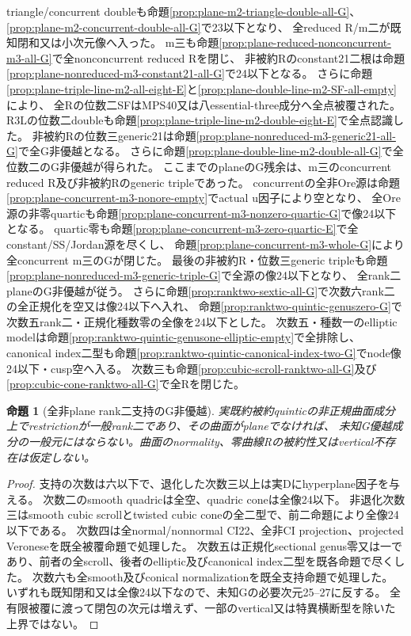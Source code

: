 \documentclass[a4paper,11pt]{ltjsarticle}
\newtheorem{proposition}{命題}[section]
\theoremstyle{definition}
\begin{document}
triangle/concurrent doubleも命題\ref{prop:plane-m2-triangle-double-all-G}、\ref{prop:plane-m2-concurrent-double-all-G}で23以下となり、
全reduced R/m二が既知閉和又は小次元像へ入った。
m三も命題\ref{prop:plane-reduced-nonconcurrent-m3-all-G}で全nonconcurrent reduced Rを閉じ、
非被約Rのconstant21二根は命題\ref{prop:plane-nonreduced-m3-constant21-all-G}で24以下となる。
さらに命題\ref{prop:plane-triple-line-m2-all-eight-E}と\ref{prop:plane-double-line-m2-SF-all-empty}により、
全Rの位数二SFはMPS40又は八essential-three成分へ全点被覆された。
R3Lの位数二doubleも命題\ref{prop:plane-triple-line-m2-double-eight-E}で全点認識した。
非被約Rの位数三generic21は命題\ref{prop:plane-nonreduced-m3-generic21-all-G}で全G非優越となる。
さらに命題\ref{prop:plane-double-line-m2-double-all-G}で全位数二のG非優越が得られた。
ここまでのplaneのG残余は、m三のconcurrent reduced R及び非被約Rのgeneric tripleであった。
concurrentの全非Ore源は命題\ref{prop:plane-concurrent-m3-nonore-empty}でactual u因子により空となり、
全Ore源の非零quarticも命題\ref{prop:plane-concurrent-m3-nonzero-quartic-G}で像24以下となる。
quartic零も命題\ref{prop:plane-concurrent-m3-zero-quartic-E}で全constant/SS/Jordan源を尽くし、
命題\ref{prop:plane-concurrent-m3-whole-G}により全concurrent m三のGが閉じた。
最後の非被約R・位数三generic tripleも命題\ref{prop:plane-nonreduced-m3-generic-triple-G}で全源の像24以下となり、
全rank二planeのG非優越が従う。
さらに命題\ref{prop:ranktwo-sextic-all-G}で次数六rank二の全正規化を空又は像24以下へ入れ、
命題\ref{prop:ranktwo-quintic-genuszero-G}で次数五rank二・正規化種数零の全像を24以下とした。
次数五・種数一のelliptic modelは命題\ref{prop:ranktwo-quintic-genusone-elliptic-empty}で全排除し、
canonical index二型も命題\ref{prop:ranktwo-quintic-canonical-index-two-G}でnode像24以下・cusp空へ入る。
次数三も命題\ref{prop:cubic-scroll-ranktwo-all-G}及び\ref{prop:cubic-cone-ranktwo-all-G}で全Rを閉じた。

\begin{proposition}[全非plane rank二支持のG非優越]\label{prop:nonplane-ranktwo-all-G}
実既約被約quinticの非正規曲面成分上でrestrictionが一般rank二であり、その曲面がplaneでなければ、
未知G優越成分の一般元にはならない。曲面のnormality、零曲線Rの被約性又はvertical不存在は仮定しない。
\end{proposition}
\begin{proof}
支持の次数は六以下で、退化した次数三以上は実Dにhyperplane因子を与える。
次数二のsmooth quadricは全空、quadric coneは全像24以下。
非退化次数三はsmooth cubic scrollとtwisted cubic coneの全二型で、前二命題により全像24以下である。
次数四は全normal/nonnormal CI22、全非CI projection、projected Veroneseを既全被覆命題で処理した。
次数五は正規化sectional genus零又は一であり、前者の全scroll、後者のelliptic及びcanonical index二型を既各命題で尽くした。
次数六も全smooth及びconical normalizationを既全支持命題で処理した。
いずれも既知閉和又は全像24以下なので、未知Gの必要次元25--27に反する。
全有限被覆に渡って閉包の次元は増えず、一部のvertical又は特異横断型を除いた上界ではない。
\end{proof}
\end{document}
